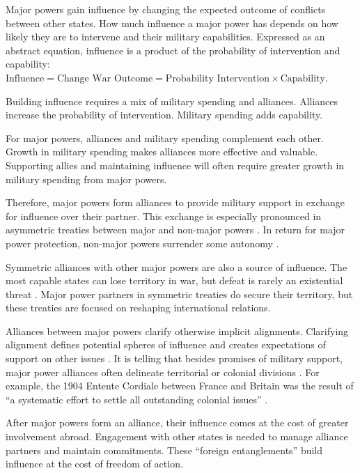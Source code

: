 \documentclass[12pt]{article}
\begin{document}
Major powers gain influence by changing the expected outcome of conflicts between other states. 
How much influence a major power has depends on how likely they are to intervene and their military capabilities. 
Expressed as an abstract equation, influence is a product of the probability of intervention and capability: $\mbox{Influence} = \mbox{Change War Outcome} = \mbox{Probability Intervention} \times \mbox{Capability}$.


Building influence requires a mix of military spending and alliances. 
Alliances increase the probability of intervention. 
Military spending adds capability. 


For major powers, alliances and military spending complement each other. 
Growth in military spending makes alliances more effective and valuable. 
Supporting allies and maintaining influence will often require greater growth in military spending from major powers. 


Therefore, major powers form alliances to provide military support in exchange for influence over their partner. 
This exchange is especially pronounced in asymmetric treaties between major and non-major powers \citep{Morrow1993}. 
In return for major power protection, non-major powers surrender some autonomy \citep{Lake2009}. 


Symmetric alliances with other major powers are also a source of influence.
The most capable states can lose territory in war, but defeat is rarely an existential threat \citep{Fazal2011}.  
Major power partners in symmetric treaties do secure their territory, but these treaties are focused on reshaping international relations. 


Alliances between major powers clarify otherwise implicit alignments. 
Clarifying alignment defines potential spheres of influence and creates expectations of support on other issues \citep{Snyder1997}. 
It is telling that besides promises of military support, major power alliances often delineate territorial or colonial divisions \cite{Langer1950, Kissinger1994}.
For example, the 1904 Entente Cordiale between France and Britain was the result of ``a systematic effort to settle all outstanding colonial issues'' \citep[pg. 189]{Kissinger1994}.   


After major powers form an alliance, their influence comes at the cost of greater involvement abroad.
Engagement with other states is needed to manage alliance partners and maintain commitments.
These ``foreign entanglements'' build influence at the cost of freedom of action.
\end{document}
